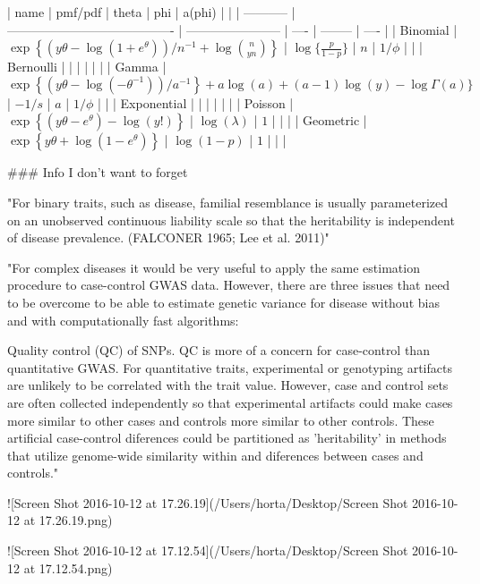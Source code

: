 \documentclass{TMarticle}
\begin{document}
| name        | pmf/pdf                                  | theta                   | phi  | a(phi)   |      |
| ----------- | ---------------------------------------- | ----------------------- | ---- | -------- | ---- |
| Binomial    | $\exp\left\{(y\theta - \log(1+e^\theta))/n^{-1} + \log {n \choose yn}\right\}$ | $\log\{\frac{p}{1-p}\}$ | $n$  | $1/\phi$ |      |
| Bernoulli   |                                          |                         |      |          |      |
| Gamma       | $\exp\left\{(y\theta - \log(-\theta^{-1}))/a^{-1}\right\} + a\log(a) + (a-1)\log(y) - \log\Gamma(a)\}$ | $-1/s$                  | $a$  | $1/\phi$ |      |
| Exponential |                                          |                         |      |          |      |
| Poisson     | $\exp\left\{(y\theta - e^\theta) - \log(y!)\right\}$ | $\log(\lambda)$         | $1$  |          |      |
| Geometric   | $\exp\left\{y\theta + \log(1-e^\theta)\right\}$ | $\log(1-p)$             | $1$  |          |      |

### Info I don't want to forget

"For binary traits, such as disease, familial resemblance is usually parameterized on an unobserved continuous liability scale so that the heritability is independent of disease prevalence. (FALCONER 1965; Lee et al. 2011)"

"For complex diseases it would be very useful to apply the same estimation procedure to case-control GWAS data. However, there are three issues that need to be overcome to be able to estimate genetic variance for disease without bias and with computationally fast algorithms:

Quality control (QC) of SNPs. QC is more of a concern for case-control than quantitative GWAS. For quantitative traits, experimental or genotyping artifacts are unlikely to be correlated with the trait value. However, case and control sets are often collected independently so that experimental artifacts could make cases more similar to other cases and controls more similar to other controls. These artificial case-control diferences could be partitioned as 'heritability' in methods that utilize genome-wide similarity within and diferences between cases and controls."







![Screen Shot 2016-10-12 at 17.26.19](/Users/horta/Desktop/Screen Shot 2016-10-12 at 17.26.19.png)

![Screen Shot 2016-10-12 at 17.12.54](/Users/horta/Desktop/Screen Shot 2016-10-12 at 17.12.54.png)
\end{document}

